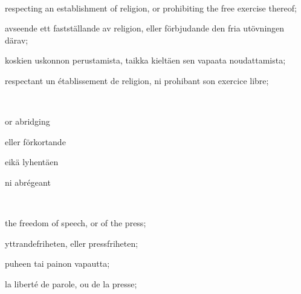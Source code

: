 \documentclass[a4,landscape,12pt]{article}
\begin{document}
~

\begin{minipage}[t]{0.22\textwidth}
 respecting an establishment of religion, or prohibiting the free exercise thereof;
\end{minipage}\textwidth
\begin{minipage}[t]{0.22\textwidth}
avseende ett fastställande av religion, eller förbjudande den fria utövningen därav;
\end{minipage}\textwidth
\begin{minipage}[t]{0.22\textwidth}
 koskien uskonnon perustamista, taikka kieltäen sen vapaata noudattamista;
\end{minipage}\textwidth
\begin{minipage}[t]{0.22\textwidth}
respectant un établissement de religion, ni prohibant son exercice libre;
\end{minipage}

~

\begin{minipage}[t]{0.22\textwidth}
or abridging
\end{minipage}\textwidth
\begin{minipage}[t]{0.22\textwidth}
eller förkortande
\end{minipage}\textwidth
\begin{minipage}[t]{0.22\textwidth}
eikä lyhentäen
\end{minipage}\textwidth
\begin{minipage}[t]{0.22\textwidth}
ni abrégeant
\end{minipage}

~

\begin{minipage}[t]{0.22\textwidth}
	the freedom of speech, or of the press;
\end{minipage}\textwidth
\begin{minipage}[t]{0.22\textwidth}
	yttrandefriheten, eller pressfriheten;
\end{minipage}\textwidth
\begin{minipage}[t]{0.22\textwidth}
	puheen tai painon vapautta;
\end{minipage}\textwidth
\begin{minipage}[t]{0.22\textwidth}
la liberté de parole, ou de la presse;
\end{minipage}
\end{document}
